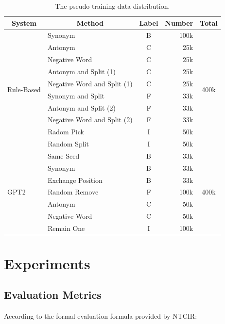 \documentclass[12pt]{article}
\begin{document}
\begin{CJK*}{UTF8}{bkai}
\begin{spacing}{1.77}
\begin{table}
  \centering
  \begin{tabular}{|l|l|c|r|c|}
  \hline
  \multicolumn{1}{|c|}{System} & \multicolumn{1}{c|}{Method} & Label & \multicolumn{1}{c|}{Number} & Total \\ \hline
  \multirow{10}{*}{Rule-Based} & Synonym & B & 100k & \multirow{10}{*}{400k} \\ \cline{2-4}
   & Antonym & C & 25k &  \\ \cline{2-4}
   & Negative Word & C & 25k &  \\ \cline{2-4}
   & Antonym and Split (1) & C & 25k &  \\ \cline{2-4}
   & Negative Word and Split (1) & C & 25k &  \\ \cline{2-4}
   & Synonym and Split & F & 33k &  \\ \cline{2-4}
   & Antonym and Split (2) & F & 33k &  \\ \cline{2-4}
   & Negative Word and Split (2) & F & 33k &  \\ \cline{2-4}
   & Radom Pick & I & 50k &  \\ \cline{2-4}
   & Random Split & I & 50k &  \\ \hline
  \multirow{7}{*}{GPT2} & Same Seed & B & 33k & \multirow{7}{*}{400k} \\ \cline{2-4}
   & Synonym & B & 33k &  \\ \cline{2-4}
   & Exchange Position & B & 33k &  \\ \cline{2-4}
   & Random Remove & F & 100k &  \\ \cline{2-4}
   & Antonym & C & 50k &  \\ \cline{2-4}
   & Negative Word & C & 50k &  \\ \cline{2-4}
   & Remain One & I & 100k &  \\ \hline
  \end{tabular}
  \caption{The pseudo training data distribution.}
  \label{table:pseudo_training_data_dist}
\end{table}

\section{Experiments} \label{section:experiments}
\subsection{Evaluation Metrics}
\paragraph{}
According to the formal evaluation formula provided by NTCIR:


\end{spacing}
\end{CJK*}
\end{document}
